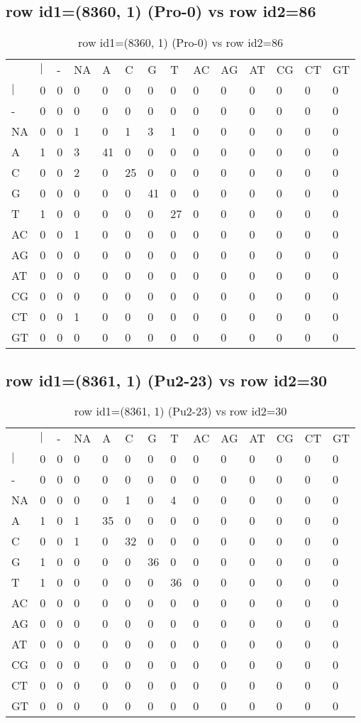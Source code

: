 \subsection{row id1=(8360, 1) (Pro-0) vs row id2=86}
\begin{center}
\begin{longtable}{|l|l|l|l|l|l|l|l|l|l|l|l|l|l|}
\caption{row id1=(8360, 1) (Pro-0) vs row id2=86} \label{table_dm384}\\
\hline
\\
\hline
&$|$&-&NA&A&C&G&T&AC&AG&AT&CG&CT&GT\\
$|$&0&0&0&0&0&0&0&0&0&0&0&0&0\\
-&0&0&0&0&0&0&0&0&0&0&0&0&0\\
NA&0&0&1&0&1&3&1&0&0&0&0&0&0\\
A&1&0&3&41&0&0&0&0&0&0&0&0&0\\
C&0&0&2&0&25&0&0&0&0&0&0&0&0\\
G&0&0&0&0&0&41&0&0&0&0&0&0&0\\
T&1&0&0&0&0&0&27&0&0&0&0&0&0\\
AC&0&0&1&0&0&0&0&0&0&0&0&0&0\\
AG&0&0&0&0&0&0&0&0&0&0&0&0&0\\
AT&0&0&0&0&0&0&0&0&0&0&0&0&0\\
CG&0&0&0&0&0&0&0&0&0&0&0&0&0\\
CT&0&0&1&0&0&0&0&0&0&0&0&0&0\\
GT&0&0&0&0&0&0&0&0&0&0&0&0&0\\
\hline
\end{longtable}
\end{center}

\subsection{row id1=(8361, 1) (Pu2-23) vs row id2=30}
\begin{center}
\begin{longtable}{|l|l|l|l|l|l|l|l|l|l|l|l|l|l|}
\caption{row id1=(8361, 1) (Pu2-23) vs row id2=30} \label{table_dm386}\\
\hline
\\
\hline
&$|$&-&NA&A&C&G&T&AC&AG&AT&CG&CT&GT\\
$|$&0&0&0&0&0&0&0&0&0&0&0&0&0\\
-&0&0&0&0&0&0&0&0&0&0&0&0&0\\
NA&0&0&0&0&1&0&4&0&0&0&0&0&0\\
A&1&0&1&35&0&0&0&0&0&0&0&0&0\\
C&0&0&1&0&32&0&0&0&0&0&0&0&0\\
G&1&0&0&0&0&36&0&0&0&0&0&0&0\\
T&1&0&0&0&0&0&36&0&0&0&0&0&0\\
AC&0&0&0&0&0&0&0&0&0&0&0&0&0\\
AG&0&0&0&0&0&0&0&0&0&0&0&0&0\\
AT&0&0&0&0&0&0&0&0&0&0&0&0&0\\
CG&0&0&0&0&0&0&0&0&0&0&0&0&0\\
CT&0&0&0&0&0&0&0&0&0&0&0&0&0\\
GT&0&0&0&0&0&0&0&0&0&0&0&0&0\\
\hline
\end{longtable}
\end{center}

